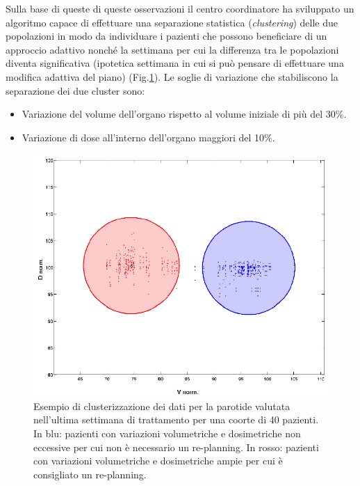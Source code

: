Sulla base di queste di queste osservazioni il centro coordinatore ha sviluppato un algoritmo capace di effettuare una separazione statistica (\textit{clustering}) delle due popolazioni in modo da individuare i pazienti che possono beneficiare di un approccio adattivo nonché la settimana per cui la differenza tra le popolazioni diventa significativa (ipotetica settimana in cui si può pensare di effettuare una modifica adattiva del piano)\cite{Guidi2015} (Fig.\ref{fig:Modena_cluster}). Le soglie di variazione che stabiliscono la separazione dei due cluster sono:
\begin{itemize}
\item Variazione del volume dell'organo rispetto al volume iniziale di più del 30\%.
\item Variazione di dose all'interno dell'organo maggiori del 10\%.
\end{itemize}
\begin{figure}
\centering
\includegraphics[width=.7\textwidth]{./cap3/Modena_cluster.png}
\caption{Esempio di clusterizzazione dei dati per la parotide valutata nell'ultima settimana di trattamento per una coorte di 40 pazienti. In blu: pazienti con variazioni volumetriche e dosimetriche non eccessive per cui non è necessario un re-planning. In rosso: pazienti con variazioni volumetriche e dosimetriche ampie per cui è consigliato un re-planning.}
\label{fig:Modena_cluster}
\end{figure}

